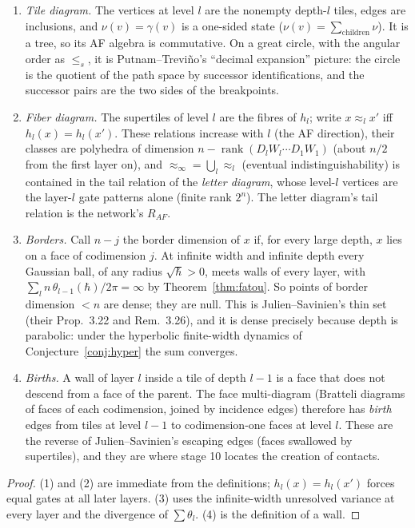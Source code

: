 \label{sec:borders}
\begin{proposition}\label{prop:twodiagrams}
\begin{enumerate}[leftmargin=*]
\item \emph{Tile diagram.} The vertices at level $l$ are the nonempty depth-$l$ tiles, edges are inclusions, and $\nu(v)=\gamma(v)$ is a one-sided
state ($\nu(v)=\sum_{\text{children}}\nu$). It is a tree, so its AF algebra is commutative. On a great circle, with the angular order as
$\le_s$, it is Putnam--Trevi\~no's ``decimal expansion'' picture: the circle is the quotient of the path space by successor
identifications, and the successor pairs are the two sides of the breakpoints.
\item \emph{Fiber diagram.} The supertiles of level $l$ are the fibres of $h_l$; write $x\approx_lx'$ iff $h_l(x)=h_l(x')$. These relations
increase with $l$ (the AF direction), their classes are polyhedra of dimension $n-\operatorname{rank}(D_lW_l\cdots D_1W_1)$ (about $n/2$ from the
first layer on), and $\approx_\infty=\bigcup_l\approx_l$ (eventual indistinguishability) is contained in the tail relation of the \emph{letter
diagram}, whose level-$l$ vertices are the layer-$l$ gate patterns alone (finite rank $2^n$). The letter diagram's tail relation is the network's
$R_{AF}$.
\item \emph{Borders.} Call $n-j$ the border dimension of $x$ if, for every large depth, $x$ lies on a face of codimension $j$. At infinite width
and infinite depth every Gaussian ball, of any radius $\sqrt\hbar>0$, meets walls of every layer, with $\sum_ln\,\theta_{l-1}(\hbar)/2\pi=\infty$ by
Theorem~\ref{thm:fatou}. So points of border dimension $<n$ are dense; they are null. This is Julien--Savinien's thin set (their
Prop.~3.22 and Rem.~3.26), and it is dense precisely because depth is parabolic: under the hyperbolic finite-width dynamics of
Conjecture~\ref{conj:hyper} the sum converges.
\item \emph{Births.} A wall of layer $l$ inside a tile of depth $l-1$ is a face that does not descend from a face of the parent. The face
multi-diagram (Bratteli diagrams of faces of each codimension, joined by incidence edges) therefore has \emph{birth} edges from tiles at
level $l-1$ to codimension-one faces at level $l$. These are the reverse of Julien--Savinien's escaping edges (faces swallowed by
supertiles), and they are where stage 10 locates the creation of contacts.
\end{enumerate}
\end{proposition}
\begin{proof}
(1) and (2) are immediate from the definitions; $h_l(x)=h_l(x')$ forces equal gates at all later layers. (3) uses the infinite-width
unresolved variance at every layer and the divergence of $\sum\theta_l$. (4) is the definition of a wall.
\end{proof}

